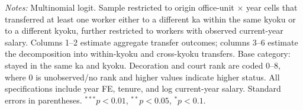 \begin{table}[htbp]
\begin{threeparttable}
\begin{tablenotes}[flushleft]\footnotesize
\item \textit{Notes:} Multinomial logit. Sample restricted to origin office-unit $\times$ year cells that transferred at least one worker either to a different ka within the same kyoku or to a different kyoku, further restricted to workers with observed current-year salary. Columns 1--2 estimate aggregate transfer outcomes; columns 3--6 estimate the decomposition into within-kyoku and cross-kyoku transfers. Base category: stayed in the same ka and kyoku. Decoration and court rank are coded 0--8, where 0 is unobserved/no rank and higher values indicate higher status. All specifications include year FE, tenure, and log current-year salary. Standard errors in parentheses. $^{***}p<0.01$, $^{**}p<0.05$, $^{*}p<0.1$.
\end{tablenotes}\end{threeparttable}\end{table}
